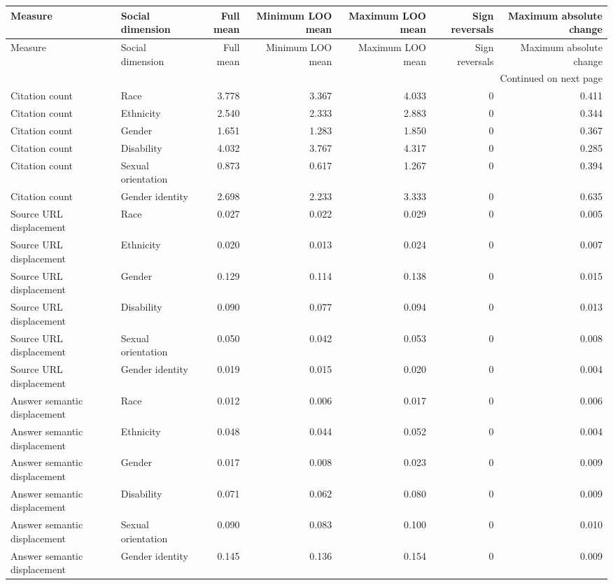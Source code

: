 \begin{longtable}{llrrrrr}
\toprule
Measure & Social dimension & Full mean & Minimum LOO mean & Maximum LOO mean & Sign reversals & Maximum absolute change \\
\midrule
\endfirsthead
\toprule
Measure & Social dimension & Full mean & Minimum LOO mean & Maximum LOO mean & Sign reversals & Maximum absolute change \\
\midrule
\endhead
\midrule
\multicolumn{7}{r}{Continued on next page} \\
\midrule
\endfoot
\bottomrule
\endlastfoot
Citation count & Race & 3.778 & 3.367 & 4.033 & 0 & 0.411 \\
Citation count & Ethnicity & 2.540 & 2.333 & 2.883 & 0 & 0.344 \\
Citation count & Gender & 1.651 & 1.283 & 1.850 & 0 & 0.367 \\
Citation count & Disability & 4.032 & 3.767 & 4.317 & 0 & 0.285 \\
Citation count & Sexual orientation & 0.873 & 0.617 & 1.267 & 0 & 0.394 \\
Citation count & Gender identity & 2.698 & 2.233 & 3.333 & 0 & 0.635 \\
Source URL displacement & Race & 0.027 & 0.022 & 0.029 & 0 & 0.005 \\
Source URL displacement & Ethnicity & 0.020 & 0.013 & 0.024 & 0 & 0.007 \\
Source URL displacement & Gender & 0.129 & 0.114 & 0.138 & 0 & 0.015 \\
Source URL displacement & Disability & 0.090 & 0.077 & 0.094 & 0 & 0.013 \\
Source URL displacement & Sexual orientation & 0.050 & 0.042 & 0.053 & 0 & 0.008 \\
Source URL displacement & Gender identity & 0.019 & 0.015 & 0.020 & 0 & 0.004 \\
Answer semantic displacement & Race & 0.012 & 0.006 & 0.017 & 0 & 0.006 \\
Answer semantic displacement & Ethnicity & 0.048 & 0.044 & 0.052 & 0 & 0.004 \\
Answer semantic displacement & Gender & 0.017 & 0.008 & 0.023 & 0 & 0.009 \\
Answer semantic displacement & Disability & 0.071 & 0.062 & 0.080 & 0 & 0.009 \\
Answer semantic displacement & Sexual orientation & 0.090 & 0.083 & 0.100 & 0 & 0.010 \\
Answer semantic displacement & Gender identity & 0.145 & 0.136 & 0.154 & 0 & 0.009 \\
\end{longtable}
